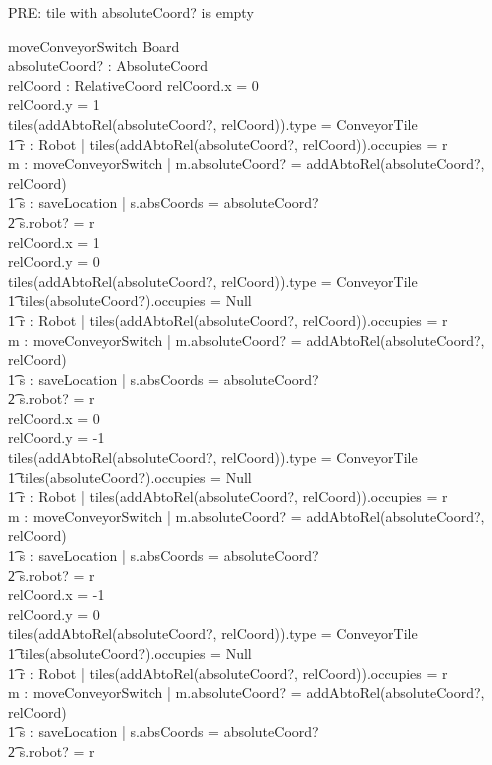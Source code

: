 \documentclass[a4paper,11pt]{article}
\begin{document}
PRE: tile with absoluteCoord? is empty
\begin{schema}{moveConveyorSwitch}
\Delta Board \\
absoluteCoord? : AbsoluteCoord \\
relCoord : RelativeCoord
\where
relCoord.x = 0 \\
relCoord.y = 1 \\
\IF tiles(addAbtoRel(absoluteCoord?, relCoord)).type = ConveyorTile \\ \t1
\exists r : Robot | tiles(addAbtoRel(absoluteCoord?, relCoord)).occupies = r \\ 
\THEN \exists m : moveConveyorSwitch | m.absoluteCoord? = addAbtoRel(absoluteCoord?, relCoord) \\ \t1
\exists s : saveLocation | s.absCoords = absoluteCoord? \\ \t2
s.robot? = r \\
relCoord.x = 1 \\
relCoord.y = 0 \\
\IF tiles(addAbtoRel(absoluteCoord?, relCoord)).type = ConveyorTile \\ \t1
tiles(absoluteCoord?).occupies \not = Null \\ \t1
\exists r : Robot | tiles(addAbtoRel(absoluteCoord?, relCoord)).occupies = r \\ 
\THEN \exists m : moveConveyorSwitch | m.absoluteCoord? = addAbtoRel(absoluteCoord?, relCoord) \\ \t1
\exists s : saveLocation | s.absCoords = absoluteCoord? \\ \t2
s.robot? = r \\
relCoord.x = 0 \\
relCoord.y = -1 \\
\IF tiles(addAbtoRel(absoluteCoord?, relCoord)).type = ConveyorTile \\ \t1
tiles(absoluteCoord?).occupies \not = Null \\ \t1
\exists r : Robot | tiles(addAbtoRel(absoluteCoord?, relCoord)).occupies = r \\
\THEN \exists m : moveConveyorSwitch | m.absoluteCoord? = addAbtoRel(absoluteCoord?, relCoord) \\ \t1
\exists s : saveLocation | s.absCoords = absoluteCoord? \\ \t2
s.robot? = r \\
relCoord.x = -1 \\
relCoord.y = 0 \\
\IF tiles(addAbtoRel(absoluteCoord?, relCoord)).type = ConveyorTile \\ \t1
tiles(absoluteCoord?).occupies \not = Null \\ \t1
\exists r : Robot | tiles(addAbtoRel(absoluteCoord?, relCoord)).occupies = r \\
\THEN \exists m : moveConveyorSwitch | m.absoluteCoord? = addAbtoRel(absoluteCoord?, relCoord) \\ \t1
\exists s : saveLocation | s.absCoords = absoluteCoord? \\ \t2
s.robot? = r \\
\end{schema}
\end{document}
